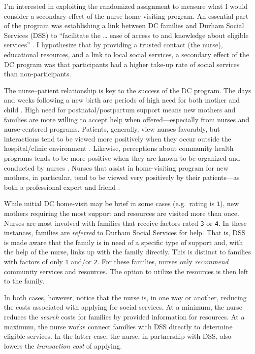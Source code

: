 \documentclass[12pt,letterpaperpaper,]{book}
\begin{document}
I'm interested in exploiting the randomized assignment to measure what I
would consider a secondary effect of the nurse home-visiting program. An
essential part of the program was establishing a link between DC
families and Durham Social Services (DSS) to ``facilitate the \ldots{}
ease of access to and knowledge about eligible services''
\citep{odonnell_family_2015}. I hypothesize that by providing a trusted
contact (the nurse), educational resources, and a link to local social
services, a secondary effect of the DC program was that participants had
a higher take-up rate of social services than non-participants.

The nurse--patient relationship is key to the success of the DC program.
The days and weeks following a new birth are periods of high need for
both mother and child \citep{organization_who_2013, evans_cohort_2001}.
High need for postnatal/postpartum support means new mothers and
families are more willing to accept help when offered---especially from
nurses and nurse-centered programs. Patients, generally, view nurses
favorably, but interactions tend to be viewed more positively when they
occur outside the hospital/clinic environment
\citep{jansson_first-time_2002}. Likewise, perceptions about community
health programs tends to be more positive when they are known to be
organized and conducted by nurses \citep{kneipp_reasons_2009}. Nurses
that assist in home-visiting program for new mothers, in particular,
tend to be viewed very positively by their patients---as both a
professional expert and friend \citep{landy_mothers_2012}.

While initial DC home-visit may be brief in some cases (e.g.~rating is
\texttt{1}), new mothers requiring the most support and resources are
visited more than once. Nurses are most involved with families that
receive factors rated \texttt{3} or \texttt{4}. In these instances,
families are \emph{referred} to Durham Social Services for help. That
is, DSS is made aware that the family is in need of a specific type of
support and, with the help of the nurse, links up with the family
directly. This is distinct to families with factors of only \texttt{1}
and/or \texttt{2}. For these families, nurses only \emph{recommend}
community services and resources. The option to utilize the resources is
then left to the family.

In both cases, however, notice that the nurse is, in one way or another,
reducing the costs associated with applying for social services. At a
minimum, the nurse reduces the \emph{search} costs for families by
provided information for resources. At a maximum, the nurse works
connect families with DSS directly to determine eligible services. In
the latter case, the nurse, in partnership with DSS, also lowers the
\emph{transaction cost} of applying.
\end{document}
